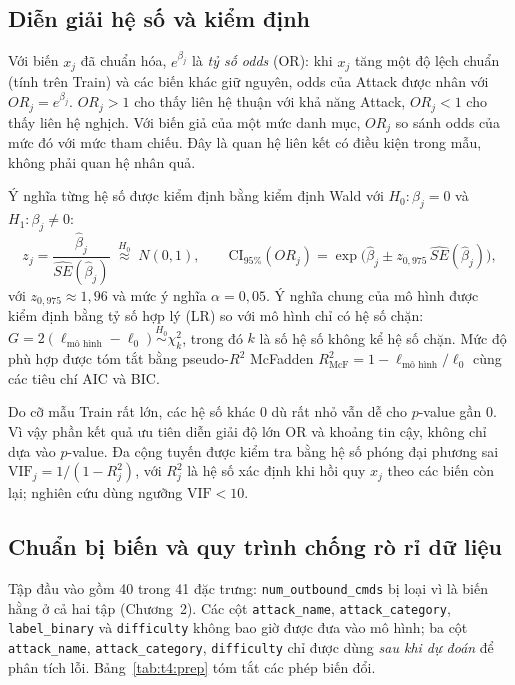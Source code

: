 \documentclass[../main.tex]{subfiles}
\begin{document}
\subsection{Diễn giải hệ số và kiểm định}
Với biến $x_j$ đã chuẩn hóa, $e^{\beta_j}$ là \emph{tỷ số odds} (OR): khi $x_j$ tăng một độ lệch chuẩn (tính trên Train) và các biến khác giữ nguyên, odds của Attack được nhân với $OR_j=e^{\beta_j}$. $OR_j>1$ cho thấy liên hệ thuận với khả năng Attack, $OR_j<1$ cho thấy liên hệ nghịch. Với biến giả của một mức danh mục, $OR_j$ so sánh odds của mức đó với mức tham chiếu. Đây là quan hệ liên kết có điều kiện trong mẫu, không phải quan hệ nhân quả.

Ý nghĩa từng hệ số được kiểm định bằng kiểm định Wald với $H_0:\beta_j=0$ và $H_1:\beta_j\neq0$:
\begin{equation}
z_j=\frac{\hat\beta_j}{\widehat{SE}(\hat\beta_j)}\;\overset{H_0}{\approx}\;N(0,1),
\qquad
\text{CI}_{95\%}(OR_j)=\exp\!\Big(\hat\beta_j\pm z_{0{,}975}\,\widehat{SE}(\hat\beta_j)\Big),
\label{eq:t4:wald}
\end{equation}
với $z_{0{,}975}\approx1{,}96$ và mức ý nghĩa $\alpha=0{,}05$. Ý nghĩa chung của mô hình được kiểm định bằng tỷ số hợp lý (LR) so với mô hình chỉ có hệ số chặn: $G=2(\ell_{\text{mô hình}}-\ell_0)\overset{H_0}{\sim}\chi^2_{k}$, trong đó $k$ là số hệ số không kể hệ số chặn. Mức độ phù hợp được tóm tắt bằng pseudo-$R^2$ McFadden $R^2_{\text{McF}}=1-\ell_{\text{mô hình}}/\ell_0$ \cite{task4_mcfadden1974} cùng các tiêu chí AIC và BIC.

Do cỡ mẫu Train rất lớn, các hệ số khác 0 dù rất nhỏ vẫn dễ cho $p$-value gần 0. Vì vậy phần kết quả ưu tiên diễn giải độ lớn OR và khoảng tin cậy, không chỉ dựa vào $p$-value. Đa cộng tuyến được kiểm tra bằng hệ số phóng đại phương sai $\mathrm{VIF}_j=1/(1-R_j^2)$, với $R_j^2$ là hệ số xác định khi hồi quy $x_j$ theo các biến còn lại; nghiên cứu dùng ngưỡng $\mathrm{VIF}<10$.

\subsection{Chuẩn bị biến và quy trình chống rò rỉ dữ liệu}
Tập đầu vào gồm 40 trong 41 đặc trưng: \texttt{num\_outbound\_cmds} bị loại vì là biến hằng ở cả hai tập (Chương~2). Các cột \texttt{attack\_name}, \texttt{attack\_category}, \texttt{label\_binary} và \texttt{difficulty} không bao giờ được đưa vào mô hình; ba cột \texttt{attack\_name}, \texttt{attack\_category}, \texttt{difficulty} chỉ được dùng \emph{sau khi dự đoán} để phân tích lỗi. Bảng~\ref{tab:t4:prep} tóm tắt các phép biến đổi.
\end{document}
